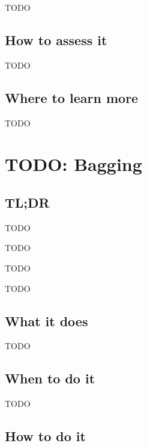 \documentclass[
]{book}
\providecommand{\tightlist}{%
  \setlength{\itemsep}{0pt}\setlength{\parskip}{0pt}}
\begin{document}
TODO

\hypertarget{how-to-assess-it-14}{%
\section{How to assess it}\label{how-to-assess-it-14}}

TODO

\hypertarget{where-to-learn-more-14}{%
\section{Where to learn more}\label{where-to-learn-more-14}}

TODO

\hypertarget{bagging}{%
\chapter{TODO: Bagging}\label{bagging}}

\hypertarget{tldr-15}{%
\section{TL;DR}\label{tldr-15}}

\begin{description}
\tightlist
\item[What it does]
TODO
\item[When to do it]
TODO
\item[How to do it]
TODO
\item[How to assess it]
TODO
\end{description}

\hypertarget{what-it-does-15}{%
\section{What it does}\label{what-it-does-15}}

TODO

\hypertarget{when-to-do-it-15}{%
\section{When to do it}\label{when-to-do-it-15}}

TODO

\hypertarget{how-to-do-it-15}{%
\section{How to do it}\label{how-to-do-it-15}}
\end{document}
